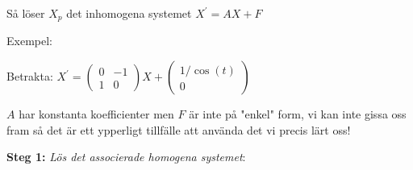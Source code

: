 \noindent Så löser $X_p$ det inhomogena systemet $X^{\prime} = AX+F$
\par\bigskip
\noindent Exempel:\par
\noindent Betrakta: $X^{\prime} = \begin{pmatrix}0&-1\\1&0\end{pmatrix}X+\begin{pmatrix}1/\cos(t)\\0\end{pmatrix}$
\par\bigskip
\noindent $A$ har konstanta koefficienter men $F$ är inte på "enkel" form, vi kan inte gissa oss fram så det är ett ypperligt tillfälle att använda det vi precis lärt oss!
\par\bigskip
\noindent\textbf{Steg 1:} \textit{Lös det associerade homogena systemet}:
\par\bigskip

